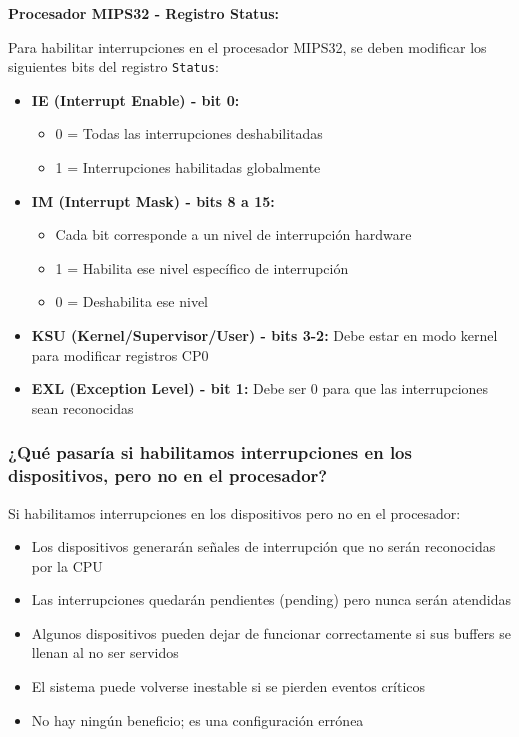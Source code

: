 \documentclass[12pt]{article}
\begin{document}
	\textbf{Procesador MIPS32 - Registro Status:}
	
	Para habilitar interrupciones en el procesador MIPS32, se deben modificar los siguientes bits del registro \texttt{Status}:
	
	\begin{itemize}
		\item \textbf{IE (Interrupt Enable) - bit 0:}
		\begin{itemize}
			\item 0 = Todas las interrupciones deshabilitadas
			\item 1 = Interrupciones habilitadas globalmente
		\end{itemize}
		
		\item \textbf{IM (Interrupt Mask) - bits 8 a 15:}
		\begin{itemize}
			\item Cada bit corresponde a un nivel de interrupción hardware
			\item 1 = Habilita ese nivel específico de interrupción
			\item 0 = Deshabilita ese nivel
		\end{itemize}
		
		\item \textbf{KSU (Kernel/Supervisor/User) - bits 3-2:} Debe estar en modo kernel para modificar registros CP0
		
		\item \textbf{EXL (Exception Level) - bit 1:} Debe ser 0 para que las interrupciones sean reconocidas
	\end{itemize}
	
	\subsubsection{¿Qué pasaría si habilitamos interrupciones en los dispositivos, pero no en el procesador?}
	
	Si habilitamos interrupciones en los dispositivos pero no en el procesador:
	\begin{itemize}
		\item Los dispositivos generarán señales de interrupción que no serán reconocidas por la CPU
		\item Las interrupciones quedarán pendientes (pending) pero nunca serán atendidas
		\item Algunos dispositivos pueden dejar de funcionar correctamente si sus buffers se llenan al no ser servidos
		\item El sistema puede volverse inestable si se pierden eventos críticos
		\item No hay ningún beneficio; es una configuración errónea
	\end{itemize}
	
\end{document}
